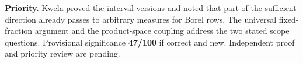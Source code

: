 \documentclass[11pt]{article}
\begin{document}
\textbf{Priority.} Kwela proved the interval versions and noted that part of the sufficient direction already passes to arbitrary measures for Borel rows. The universal fixed-fraction argument and the product-space coupling address the two stated scope questions. Provisional significance \textbf{47/100} if correct and new. Independent proof and priority review are pending.
\end{document}
